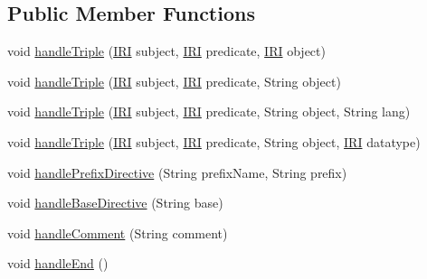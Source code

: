 \subsection*{Public Member Functions}
\begin{DoxyCompactItemize}
\item 
void \hyperlink{classuk_1_1ac_1_1manchester_1_1cs_1_1owl_1_1owlapi_1_1turtle_1_1parser_1_1_console_triple_handler_a8288a1104405577f00fc350ea40b90ff}{handle\-Triple} (\hyperlink{classorg_1_1semanticweb_1_1owlapi_1_1model_1_1_i_r_i}{I\-R\-I} subject, \hyperlink{classorg_1_1semanticweb_1_1owlapi_1_1model_1_1_i_r_i}{I\-R\-I} predicate, \hyperlink{classorg_1_1semanticweb_1_1owlapi_1_1model_1_1_i_r_i}{I\-R\-I} object)
\item 
void \hyperlink{classuk_1_1ac_1_1manchester_1_1cs_1_1owl_1_1owlapi_1_1turtle_1_1parser_1_1_console_triple_handler_a033844d187a7a2988d1931ac505862a4}{handle\-Triple} (\hyperlink{classorg_1_1semanticweb_1_1owlapi_1_1model_1_1_i_r_i}{I\-R\-I} subject, \hyperlink{classorg_1_1semanticweb_1_1owlapi_1_1model_1_1_i_r_i}{I\-R\-I} predicate, String object)
\item 
void \hyperlink{classuk_1_1ac_1_1manchester_1_1cs_1_1owl_1_1owlapi_1_1turtle_1_1parser_1_1_console_triple_handler_a6a3c1c6ea0ef6c531b87d377f6c38fd6}{handle\-Triple} (\hyperlink{classorg_1_1semanticweb_1_1owlapi_1_1model_1_1_i_r_i}{I\-R\-I} subject, \hyperlink{classorg_1_1semanticweb_1_1owlapi_1_1model_1_1_i_r_i}{I\-R\-I} predicate, String object, String lang)
\item 
void \hyperlink{classuk_1_1ac_1_1manchester_1_1cs_1_1owl_1_1owlapi_1_1turtle_1_1parser_1_1_console_triple_handler_a573ffbb8912a698c8ed90a1c55e89b4a}{handle\-Triple} (\hyperlink{classorg_1_1semanticweb_1_1owlapi_1_1model_1_1_i_r_i}{I\-R\-I} subject, \hyperlink{classorg_1_1semanticweb_1_1owlapi_1_1model_1_1_i_r_i}{I\-R\-I} predicate, String object, \hyperlink{classorg_1_1semanticweb_1_1owlapi_1_1model_1_1_i_r_i}{I\-R\-I} datatype)
\item 
void \hyperlink{classuk_1_1ac_1_1manchester_1_1cs_1_1owl_1_1owlapi_1_1turtle_1_1parser_1_1_console_triple_handler_a38051af235a248d2d3168c645537fe3f}{handle\-Prefix\-Directive} (String prefix\-Name, String prefix)
\item 
void \hyperlink{classuk_1_1ac_1_1manchester_1_1cs_1_1owl_1_1owlapi_1_1turtle_1_1parser_1_1_console_triple_handler_a672b2911622a2761d7e105d54d00da3c}{handle\-Base\-Directive} (String base)
\item 
void \hyperlink{classuk_1_1ac_1_1manchester_1_1cs_1_1owl_1_1owlapi_1_1turtle_1_1parser_1_1_console_triple_handler_acf5f9ee0df84717b4bb39ccf5367352b}{handle\-Comment} (String comment)
\item 
void \hyperlink{classuk_1_1ac_1_1manchester_1_1cs_1_1owl_1_1owlapi_1_1turtle_1_1parser_1_1_console_triple_handler_a680686aac0dd4cf35a455236bfe671a6}{handle\-End} ()
\end{DoxyCompactItemize}


